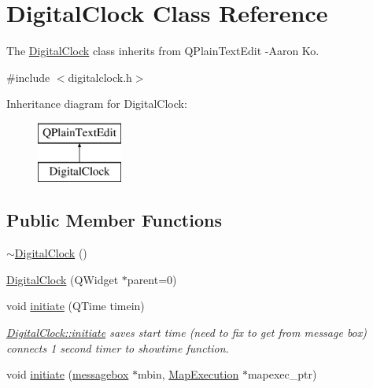 \hypertarget{class_digital_clock}{}\section{Digital\+Clock Class Reference}
\label{class_digital_clock}


The \hyperlink{class_digital_clock}{Digital\+Clock} class inherits from Q\+Plain\+Text\+Edit -\/\+Aaron Ko.  




{\ttfamily \#include $<$digitalclock.\+h$>$}

Inheritance diagram for Digital\+Clock\+:\begin{figure}[H]
\begin{center}
\leavevmode
\includegraphics[height=2.000000cm]{class_digital_clock}
\end{center}
\end{figure}
\subsection*{Public Member Functions}
\begin{DoxyCompactItemize}
\item 
\hyperlink{class_digital_clock_ab87ec7559579311929e8542dbcf5e294}{$\sim$\+Digital\+Clock} ()
\item 
\hyperlink{class_digital_clock_a1df69f177d5defdd5029ff2e6b7cb564}{Digital\+Clock} (Q\+Widget $\ast$parent=0)
\item 
void \hyperlink{class_digital_clock_a070278bd43a6162c7a666f354c3d1087}{initiate} (Q\+Time timein)
\begin{DoxyCompactList}\small\item\em \hyperlink{class_digital_clock_a070278bd43a6162c7a666f354c3d1087}{Digital\+Clock\+::initiate} saves start time (need to fix to get from message box) connects 1 second timer to showtime function. \end{DoxyCompactList}\item 
void \hyperlink{class_digital_clock_afdcf81f100c3a2ef9bd5961c8f82562f}{initiate} (\hyperlink{classmessagebox}{messagebox} $\ast$mbin, \hyperlink{class_map_execution}{Map\+Execution} $\ast$mapexec\+\_\+ptr)
\end{DoxyCompactItemize}
